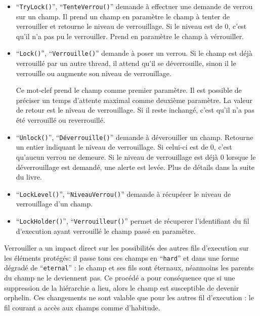 \documentclass[a5paper, 12pt]{book}
\begin{document}
\begin{itemize}
  \item ``\verb!TryLock()!'', ``\verb!TenteVerrou()!'' demande à effectuer une demande de verrou
    sur un champ. Il prend un champ en paramètre le champ à tenter
    de verrouiller et retourne le niveau de verrouillage. Si le niveau est de 0,
    c'est qu'il n'a pas pu le verrouiller. Prend en paramètre le champ à vérrouiller.
    
  \item ``\verb!Lock()!'', ``\verb!Verrouille()!'' demande à poser un verrou. Si le champ
    est déjà verrouillé par un autre thread, il attend qu'il se déverrouille,
    sinon il le verrouille ou augmente son niveau de verrouillage.

    Ce mot-clef prend le champ comme premier paramètre. Il est possible de
    préciser un temps d'attente maximal comme deuxième paramètre.
    La valeur de retour est le niveau de verrouillage. Si il reste inchangé,
    c'est qu'il n'a pas été verrouillé ou reverrouillé.

  \item ``\verb!Unlock()!'', ``\verb!Déverrouille()!'' demande à déverouiller un champ.
    Retourne un entier indiquant le niveau de verrouillage. Si celui-ci
    est de 0, c'est qu'aucun verrou ne demeure. Si le niveau de verrouillage
    est déjà 0 lorsque le déverrouillage est demandé, une alerte est levée.
    Plus de détails dans la suite du livre.

  \item ``\verb!LockLevel()!'', ``\verb!NiveauVerrou()!'' demande à récupérer le niveau
    de verrouillage d'un champ.

  \item ``\verb!LockHolder()!'', ``\verb!Verrouilleur()!'' permet de récuperer l'identifiant
    du fil d'execution ayant verrouillé le champ passé en paramètre.
\end{itemize}

Verrouiller a un impact direct sur les possibilités des autres fils d'execution
sur les éléments protégés: il passe tous ces champs en ``\verb!hard!'' et dans une forme
dégradé de ``\verb!eternal!'' : le champ et ses fils sont éternaux, néanmoins les parents
du champ ne le deviennent pas. Ce procédé a pour conséquence que si une suppression
de la hiérarchie a lieu, alors le champ est susceptible de devenir orphelin.
Ces changements ne sont valable que pour les autres fil d'execution : le fil courant
a accès aux champs comme d'habitude.
\end{document}
